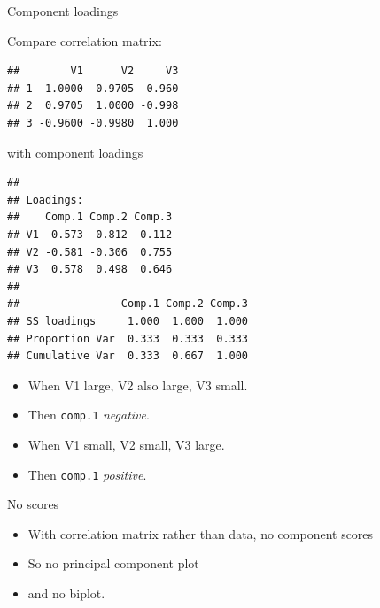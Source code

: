 \begin{frame}[fragile]{Component loadings}
  
  
  \begin{minipage}[t]{0.6\linewidth}
  Compare correlation matrix:

{\footnotesize
\begin{knitrout}
\color{fgcolor}\begin{kframe}
\begin{alltt}
\end{alltt}
\begin{verbatim}
##        V1      V2     V3
## 1  1.0000  0.9705 -0.960
## 2  0.9705  1.0000 -0.998
## 3 -0.9600 -0.9980  1.000
\end{verbatim}
\end{kframe}
\end{knitrout}
}

with component loadings

{\footnotesize
\begin{knitrout}
\color{fgcolor}\begin{kframe}
\begin{alltt}
\hlopt{$}
\end{alltt}
\begin{verbatim}
## 
## Loadings:
##    Comp.1 Comp.2 Comp.3
## V1 -0.573  0.812 -0.112
## V2 -0.581 -0.306  0.755
## V3  0.578  0.498  0.646
## 
##                Comp.1 Comp.2 Comp.3
## SS loadings     1.000  1.000  1.000
## Proportion Var  0.333  0.333  0.333
## Cumulative Var  0.333  0.667  1.000
\end{verbatim}
\end{kframe}
\end{knitrout}
}

  \end{minipage}
  \begin{minipage}[t]{0.37\linewidth}
    \begin{itemize}
    \item When V1 large, V2 also large, V3 small.
    \item Then \texttt{comp.1} \emph{negative}.
    \item When V1 small, V2 small, V3 large.
    \item Then \texttt{comp.1} \emph{positive}.
      
    \end{itemize}
  \end{minipage}
\end{frame}


\begin{frame}[fragile]{No scores}
  
  \begin{itemize}
  \item With correlation matrix rather than data, no component scores
  \item So no principal component plot
  \item and no biplot. 
  \end{itemize}
  
\end{frame}

